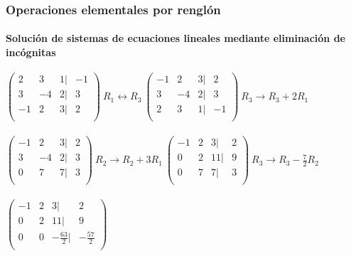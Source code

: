 \documentclass[11pt]{beamer}
\begin{document}
\begin{frame}
\frametitle{Operaciones elementales por renglón}
\framesubtitle{Solución de sistemas de ecuaciones lineales mediante eliminación de incógnitas}
${\displaystyle \mathbf {} {\begin{pmatrix}2&3&1|&-1\\3&-4&2|&3\\-1&2&3|&2\\\end{pmatrix}}} ~ R_1\leftrightarrow R_3 ~ {\displaystyle \mathbf {} {\begin{pmatrix}-1&2&3|&2\\3&-4&2|&3\\2&3&1|&-1\\\end{pmatrix}}} ~ R_3\rightarrow R_3+2R_1 ~$ \\ \hspace{0cm}\\
${\displaystyle \mathbf {} {\begin{pmatrix}-1&2&3|&2\\3&-4&2|&3\\0&7&7|&3\\\end{pmatrix}}} ~ R_2\rightarrow R_2+3R_1 ~ {\displaystyle \mathbf {} {\begin{pmatrix}-1&2&3|&2\\0&2&11|&9\\0&7&7|&3\\\end{pmatrix}}} ~ R_3\rightarrow R_3-\frac{7}{2}R_2 ~$\\ \hspace{0cm} \\
${\displaystyle \mathbf {} {\begin{pmatrix}-1&2&3|&2\\0&2&11|&9\\0&0&-\frac{63}{2}|&-\frac{57}{2}\\\end{pmatrix}}}$\\ \hspace{0cm} \\ 
\end{frame}
\end{document}
